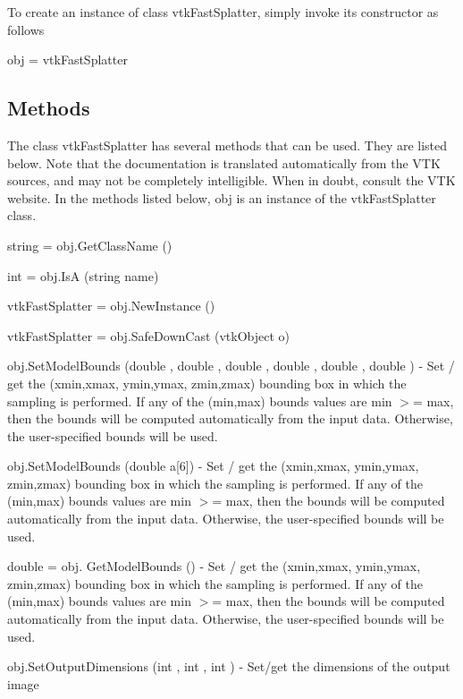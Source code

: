 To create an instance of class vtk\-Fast\-Splatter, simply invoke its constructor as follows \begin{DoxyVerb}  obj = vtkFastSplatter
\end{DoxyVerb}
 \hypertarget{vtkwidgets_vtkxyplotwidget_Methods}{}\subsection{Methods}\label{vtkwidgets_vtkxyplotwidget_Methods}
The class vtk\-Fast\-Splatter has several methods that can be used. They are listed below. Note that the documentation is translated automatically from the V\-T\-K sources, and may not be completely intelligible. When in doubt, consult the V\-T\-K website. In the methods listed below, {\ttfamily obj} is an instance of the vtk\-Fast\-Splatter class. 
\begin{DoxyItemize}
\item {\ttfamily string = obj.\-Get\-Class\-Name ()}  
\item {\ttfamily int = obj.\-Is\-A (string name)}  
\item {\ttfamily vtk\-Fast\-Splatter = obj.\-New\-Instance ()}  
\item {\ttfamily vtk\-Fast\-Splatter = obj.\-Safe\-Down\-Cast (vtk\-Object o)}  
\item {\ttfamily obj.\-Set\-Model\-Bounds (double , double , double , double , double , double )} -\/ Set / get the (xmin,xmax, ymin,ymax, zmin,zmax) bounding box in which the sampling is performed. If any of the (min,max) bounds values are min $>$= max, then the bounds will be computed automatically from the input data. Otherwise, the user-\/specified bounds will be used.  
\item {\ttfamily obj.\-Set\-Model\-Bounds (double a\mbox{[}6\mbox{]})} -\/ Set / get the (xmin,xmax, ymin,ymax, zmin,zmax) bounding box in which the sampling is performed. If any of the (min,max) bounds values are min $>$= max, then the bounds will be computed automatically from the input data. Otherwise, the user-\/specified bounds will be used.  
\item {\ttfamily double = obj. Get\-Model\-Bounds ()} -\/ Set / get the (xmin,xmax, ymin,ymax, zmin,zmax) bounding box in which the sampling is performed. If any of the (min,max) bounds values are min $>$= max, then the bounds will be computed automatically from the input data. Otherwise, the user-\/specified bounds will be used.  
\item {\ttfamily obj.\-Set\-Output\-Dimensions (int , int , int )} -\/ Set/get the dimensions of the output image  

\end{DoxyItemize}
